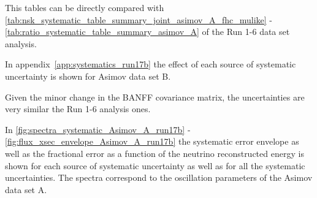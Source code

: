 This tables can be directly compared with \cref{tab:nsk_systematic_table_summary_joint_asimov_A_fhc_mulike} -
\ref{tab:ratio_systematic_table_summary_asimov_A} of the Run 1-6 data set analysis.

In appendix~\ref{app:systematics_run17b} the effect of each source of systematic uncertainty 
is shown for Asimov data set B.

Given the minor change in the BANFF covariance matrix, the uncertainties are very similar
the Run 1-6 analysis ones.




\clearpage



In \cref{fig:spectra_systematic_Asimov_A_run17b} - \ref{fig:flux_xsec_envelope_Asimov_A_run17b}
the systematic error envelope as well as the fractional error as a function of the
neutrino reconstructed energy is shown for each source of systematic uncertainty
as well as for all the systematic uncertainties. 
The spectra correspond to the oscillation parameters of the Asimov data set A.


